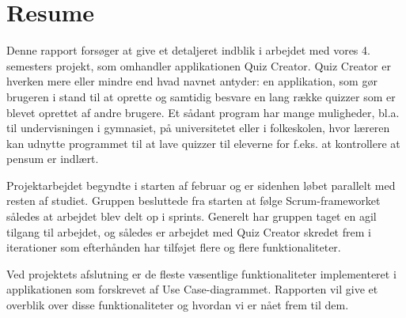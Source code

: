 \chapter*{Resume}
Denne rapport forsøger at give et detaljeret indblik i arbejdet med vores 4. semesters projekt, som omhandler applikationen Quiz Creator. Quiz Creator er hverken mere eller mindre end hvad navnet antyder: en applikation, som gør brugeren i stand til at oprette og samtidig besvare en lang række quizzer som er blevet oprettet af andre brugere. Et sådant program har mange muligheder, bl.a. til undervisningen i gymnasiet, på universitetet eller i folkeskolen, hvor læreren kan udnytte programmet til at lave quizzer til eleverne for f.eks. at kontrollere at pensum er indlært.

Projektarbejdet begyndte i starten af februar og er sidenhen løbet parallelt med resten af studiet. Gruppen besluttede fra starten at følge Scrum-frameworket således at arbejdet blev delt op i sprints. Generelt har gruppen taget en agil tilgang til arbejdet, og således er arbejdet med Quiz Creator skredet frem i iterationer som efterhånden har tilføjet flere og flere funktionaliteter. 

Ved projektets afslutning er de fleste væsentlige funktionaliteter implementeret i applikationen som forskrevet af Use Case-diagrammet. Rapporten vil give et overblik over disse funktionaliteter og hvordan vi er nået frem til dem.
